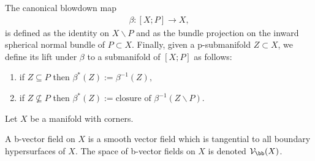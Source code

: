 The canonical blowdown map
\begin{align*}
\beta: [ X; P] \to X,
\end{align*}
is defined as the identity on $X\backslash P$ and as
the bundle projection on the inward spherical normal bundle of $P \subset X$.
Finally, given a p-submanifold $Z\subset X$, we define its
lift under $\beta$ to a submanifold of $[ X; P]$ as follows:
\begin{enumerate}
\item if $Z \subseteq P$ then $\beta^{*}(Z) := \beta^{-1}(Z),$
\item if $Z \nsubseteq P$ then $\beta^{*}(Z) := \text{closure of \ }
\beta^{-1}(Z \backslash P)$.
\end{enumerate}

Let $X$ be a manifold with corners.
\begin{defn}
A b-vector field on $X$ is a smooth vector field which is tangential to all boundary hypersurfaces of $X$.
The space of b-vector fields on $X$ is denoted $\mathcal{V}_\bb(X)$.
\end{defn}

